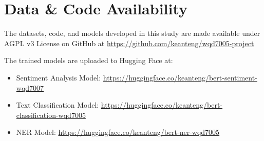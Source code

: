 \section{Data \& Code Availability}
The datasets, code, and models developed in this study are made available under AGPL v3 License on GitHub at \url{https://github.com/keanteng/wqd7005-project}

The trained models are uploaded to Hugging Face at:

\begin{itemize}
    \item Sentiment Analysis Model: \url{https://huggingface.co/keanteng/bert-sentiment-wqd7007}
    \item Text Classification Model: \url{https://huggingface.co/keanteng/bert-classification-wqd7005}
    \item NER Model: \url{https://huggingface.co/keanteng/bert-ner-wqd7005}
\end{itemize}
